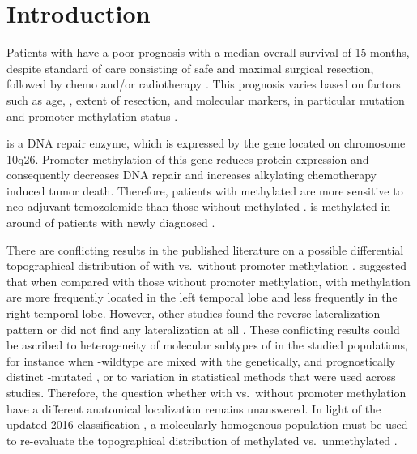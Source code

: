 \section{Introduction}

Patients with  have a poor prognosis with a median overall survival of 15 months, despite standard of care consisting of safe and maximal surgical resection, followed by chemo and/or radiotherapy \autocite{stupp2005radiotherapy}.
This prognosis varies based on factors such as age, , extent of resection, and molecular markers, in particular  mutation and  promoter methylation status \autocite{gessler2018MGMT}.

 is a DNA repair enzyme, which is expressed by the  gene located on chromosome 10q26.
Promoter methylation of this gene reduces  protein expression and consequently decreases DNA repair and increases alkylating chemotherapy induced \gls{tumor} death.
Therefore, patients with  methylated  are more sensitive to neo-adjuvant temozolomide than those without  methylated .
 is methylated in around  of patients with newly diagnosed  \autocite{hegi2005MGMT}.

There are conflicting results in the published literature on a possible differential topographical distribution of  with vs.\ without  promoter methylation \autocite{smits2017imaging}.
 suggested that when compared with those without  promoter methylation,  with  methylation are more frequently located in the left temporal lobe and less frequently in the right temporal lobe.
However, other studies found the reverse lateralization pattern \autocite{wang2014anatomical} or did not find any lateralization at all \autocite{carillo2012relationship, eoli2007methylation, han2018structural}.
These conflicting results could be ascribed to heterogeneity of molecular subtypes of  in the studied populations, for instance when -wildtype  are mixed with the genetically, and prognostically distinct -mutated , or to variation in statistical methods that were used across studies.
Therefore, the question whether  with vs.\ without  promoter methylation have a different anatomical localization remains unanswered.
In light of the updated  2016 classification \autocite{louis20162016}, a molecularly homogenous  population must be used to re-evaluate the topographical distribution of  methylated vs.\ unmethylated .

